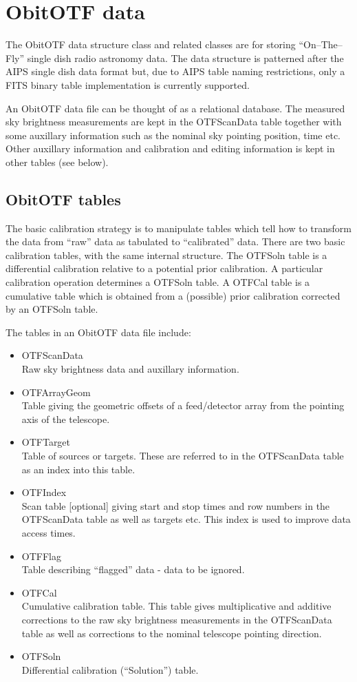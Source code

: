 \documentclass[11pt]{article}
\begin{document}
\section{ObitOTF data}
The ObitOTF data structure class and related classes are for storing
``On--The--Fly'' single dish radio astronomy data.
The data structure is patterned after the AIPS single dish data format
but, due to AIPS table naming restrictions, only a FITS binary table
implementation is currently supported.

An ObitOTF data file can be thought of as a relational database.
The measured sky brightness measurements are kept in the OTFScanData
table together with some auxillary information such as the nominal sky
pointing position, time etc.
Other auxillary information and calibration and editing information is
kept in other tables (see below).


\subsection{ObitOTF tables}
The basic calibration strategy is to manipulate tables which tell how
to transform the data from ``raw'' data as tabulated to ``calibrated''
data.
There are two basic calibration tables, with the same internal
structure.
The OTFSoln table is a differential calibration relative to a
potential prior calibration.
A particular calibration operation determines a OTFSoln table.
A OTFCal table is a cumulative table which is obtained from a
(possible) prior calibration corrected by an OTFSoln table.

The tables in an ObitOTF data file include:
\begin{itemize}
\item  OTFScanData\\
Raw sky brightness data and auxillary information.
\item  OTFArrayGeom\\
Table giving the geometric offsets of a feed/detector array from the
pointing axis of the telescope.
\item  OTFTarget\\
Table of sources or targets. 
These are referred to in the OTFScanData table as an index into this table.
\item  OTFIndex\\
Scan table [optional] giving start and stop times and row numbers in
the OTFScanData table as well as targets etc.
This index is used to improve data access times.
\item  OTFFlag\\
Table describing ``flagged'' data - data to be ignored.
\item  OTFCal\\
Cumulative calibration table.
This table gives multiplicative and additive corrections to the raw
sky brightness measurements in the OTFScanData table as well as
corrections to the nominal telescope pointing direction.
\item  OTFSoln\\
Differential calibration (``Solution'') table.
\end{itemize}
\end{document}
